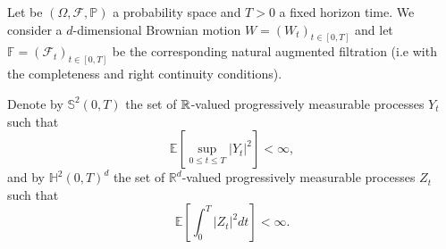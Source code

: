 Let be $(\Omega,\mathcal{F},\mathbb{P})$ a probability space and $T>0$ a fixed horizon time. We consider a $d$-dimensional Brownian motion $W=(W_t)_{t\in [0,T]}$ and let $\mathbb{F}=(\mathcal{F}_t)_{t\in[0,T]}$ be the corresponding natural augmented filtration (i.e with the completeness and right continuity conditions).

Denote by $\mathbb{S}^2(0,T)$ the set of $\mathbb{R}$-valued progressively measurable processes $Y_t$ such that 
\begin{equation}
	\mathbb{E}\left[\sup_{0\leq t \leq T}|Y_t|^2\right]<\infty,
\end{equation}  
and by $\mathbb{H}^2(0,T)^d$ the set of $\mathbb{R}^d$-valued progressively measurable processes $Z_t$ such that
\begin{equation}
	\mathbb{E}\left[\int_{0}^{T}|Z_t|^2 dt\right]<\infty.
\end{equation}

